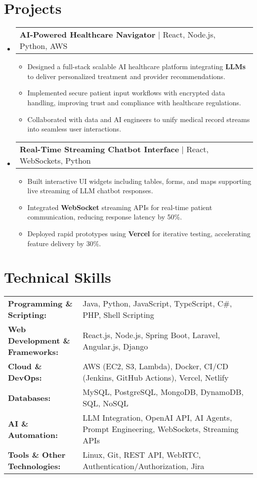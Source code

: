 \documentclass[letterpaper,11pt]{article}
\makeatletter
\newcommand{\resumeItem}[1]{
  \item\footnotesize{
    {#1 \vspace{-2pt}}
  }
}
\newcommand{\resumeProjectHeading}[2]{
    \item
    \begin{tabular*}{1.001\textwidth}{l@{\extracolsep{\fill}}r}
      \small#1 & \textbf{\small #2}\\
    \end{tabular*}\vspace{-7pt}
}
\newcommand{\resumeSubHeadingListStart}{\begin{itemize}[leftmargin=0pt, label={}]}
\newcommand{\resumeSubHeadingListEnd}{\end{itemize}}
\newcommand{\resumeItemListStart}{\begin{itemize}[leftmargin=*]}
\newcommand{\resumeItemListEnd}{\end{itemize}\vspace{-5pt}}
\makeatother
\begin{document}
\section{Projects}
    \vspace{-5pt}
    \resumeSubHeadingListStart
      \resumeProjectHeading
          {\textbf{AI-Powered Healthcare Navigator} | React, Node.js, Python, AWS}
          {}
          \resumeItemListStart
              \resumeItem{Designed a full-stack scalable AI healthcare platform integrating \textbf{LLMs} to deliver personalized treatment and provider recommendations.}
              \resumeItem{Implemented secure patient input workflows with encrypted data handling, improving trust and compliance with healthcare regulations.}
              \resumeItem{Collaborated with data and AI engineers to unify medical record streams into seamless user interactions.}
          \resumeItemListEnd
          \vspace{-16pt}
      \resumeProjectHeading
          {\textbf{Real-Time Streaming Chatbot Interface} | React, WebSockets, Python}
          {}
          \resumeItemListStart
              \resumeItem{Built interactive UI widgets including tables, forms, and maps supporting live streaming of LLM chatbot responses.}
              \resumeItem{Integrated \textbf{WebSocket} streaming APIs for real-time patient communication, reducing response latency by 50\%.}
              \resumeItem{Deployed rapid prototypes using \textbf{Vercel} for iterative testing, accelerating feature delivery by 30\%.}
          \resumeItemListEnd 
    \resumeSubHeadingListEnd
\vspace{-10pt}
\section{Technical Skills}
        \vspace{-14pt}
        \begin{table}[h]
            \footnotesize
            \begin{tabular}{p{0.3\linewidth} p{0.7\linewidth}}
                \textbf{Programming \& Scripting:} & Java, Python, JavaScript, TypeScript, C\#, PHP, Shell Scripting \\
                \textbf{Web Development \& Frameworks:} & React.js, Node.js, Spring Boot, Laravel, Angular.js, Django \\
                \textbf{Cloud \& DevOps:} & AWS (EC2, S3, Lambda), Docker, CI/CD (Jenkins, GitHub Actions), Vercel, Netlify \\
                \textbf{Databases:} & MySQL, PostgreSQL, MongoDB, DynamoDB, SQL, NoSQL \\
                \textbf{AI \& Automation:} & LLM Integration, OpenAI API, AI Agents, Prompt Engineering, WebSockets, Streaming APIs \\
                \textbf{Tools \& Other Technologies:} & Linux, Git, REST API, WebRTC, Authentication/Authorization, Jira \\
            \end{tabular}
        \end{table}
\end{document}
